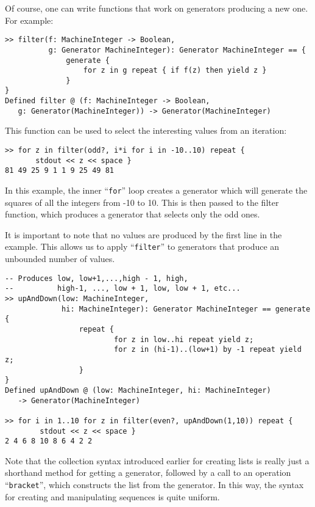 \documentclass{article}
\begin{document}
Of course, one can write functions that work on generators producing a
new one.  For example:
\begin{small}
\begin{verbatim}
>> filter(f: MachineInteger -> Boolean,
          g: Generator MachineInteger): Generator MachineInteger == {
              generate {
                  for z in g repeat { if f(z) then yield z }
              }
}
Defined filter @ (f: MachineInteger -> Boolean,
   g: Generator(MachineInteger)) -> Generator(MachineInteger)
\end{verbatim}
\end{small}
This function can be used to select the interesting values from an
iteration:
\begin{small}
\begin{verbatim}
>> for z in filter(odd?, i*i for i in -10..10) repeat {
       stdout << z << space }
81 49 25 9 1 1 9 25 49 81 
\end{verbatim}
\end{small}
In this example, the inner ``{\tt for}'' loop creates a generator
which will generate the squares of all the integers from -10 to 10.
This is then
passed to the filter function, which produces a generator that selects
only the odd ones.

It is important to note that no values are produced by the first line
in the example.  This allows us to apply ``{\tt filter}'' to
generators that produce an unbounded number of values.
\begin{small}
\begin{verbatim}
-- Produces low, low+1,...,high - 1, high,
--          high-1, ..., low + 1, low, low + 1, etc...
>> upAndDown(low: MachineInteger,
             hi: MachineInteger): Generator MachineInteger == generate {
                 repeat {
                         for z in low..hi repeat yield z;
                         for z in (hi-1)..(low+1) by -1 repeat yield z;
                 }
}
Defined upAndDown @ (low: MachineInteger, hi: MachineInteger)
   -> Generator(MachineInteger)

>> for i in 1..10 for z in filter(even?, upAndDown(1,10)) repeat {
        stdout << z << space }
2 4 6 8 10 8 6 4 2 2 
\end{verbatim}
\end{small}

Note that the collection syntax introduced earlier for creating
lists is really just a shorthand method for getting a generator,
followed by a call to an operation ``{\tt bracket}'', which constructs
the list from the generator.  In this way, the syntax for creating and
manipulating sequences is quite uniform.
\end{document}
